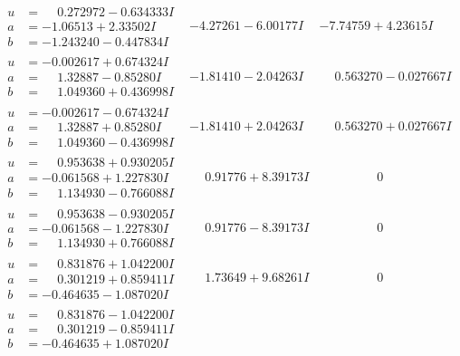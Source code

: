 \documentclass[1p]{elsarticle_modified}
\theoremstyle{definition}
\begin{document}
$$\begin{array}{c|c|c}
\begin{aligned}
u &= \phantom{-}0.272972 - 0.634333 I \\
a &= -1.06513 + 2.33502 I \\
b &= -1.243240 - 0.447834 I\end{aligned}
 & -4.27261 - 6.00177 I & -7.74759 + 4.23615 I \\ \hline\begin{aligned}
u &= -0.002617 + 0.674324 I \\
a &= \phantom{-}1.32887 - 0.85280 I \\
b &= \phantom{-}1.049360 + 0.436998 I\end{aligned}
 & -1.81410 - 2.04263 I & \phantom{-}0.563270 - 0.027667 I \\ \hline\begin{aligned}
u &= -0.002617 - 0.674324 I \\
a &= \phantom{-}1.32887 + 0.85280 I \\
b &= \phantom{-}1.049360 - 0.436998 I\end{aligned}
 & -1.81410 + 2.04263 I & \phantom{-}0.563270 + 0.027667 I \\ \hline\begin{aligned}
u &= \phantom{-}0.953638 + 0.930205 I \\
a &= -0.061568 + 1.227830 I \\
b &= \phantom{-}1.134930 - 0.766088 I\end{aligned}
 & \phantom{-}0.91776 + 8.39173 I & \phantom{-0.000000 } 0 \\ \hline\begin{aligned}
u &= \phantom{-}0.953638 - 0.930205 I \\
a &= -0.061568 - 1.227830 I \\
b &= \phantom{-}1.134930 + 0.766088 I\end{aligned}
 & \phantom{-}0.91776 - 8.39173 I & \phantom{-0.000000 } 0 \\ \hline\begin{aligned}
u &= \phantom{-}0.831876 + 1.042200 I \\
a &= \phantom{-}0.301219 + 0.859411 I \\
b &= -0.464635 - 1.087020 I\end{aligned}
 & \phantom{-}1.73649 + 9.68261 I & \phantom{-0.000000 } 0 \\ \hline\begin{aligned}
u &= \phantom{-}0.831876 - 1.042200 I \\
a &= \phantom{-}0.301219 - 0.859411 I \\
b &= -0.464635 + 1.087020 I\end{aligned}

\end{array}$$
\end{document}
